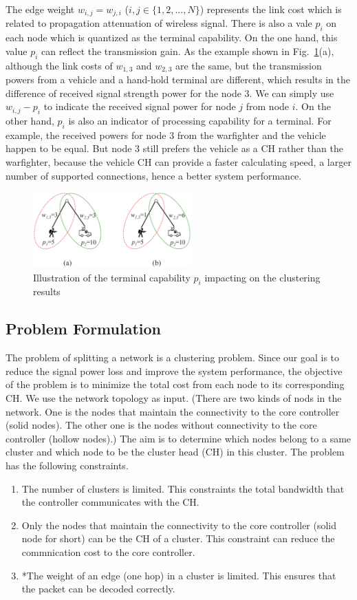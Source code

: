 \documentclass[conference]{IEEEtran}
\begin{document}
The edge weight $w_{i,j}=w_{j,i}$ ($i,j \in \{ 1,2,...,N\}$) represents the link cost which is related to propagation attenuation of wireless signal. There is also a vale $p_i$ on each node which is quantized as the terminal capability. On the one hand, this value $p_i$ can reflect the transmission gain. As the example shown in Fig.~\ref{manvehicle}(a), although the link costs of $w_{1,3}$ and $w_{2,3}$ are the same, but the transmission powers from a vehicle and a hand-hold terminal are different, which results in the difference of received signal strength power for the node 3. We can simply use $w_{i,j}-p_i$ to indicate the received signal power for node $j$ from node $i$. On the other hand, $p_i$ is also an indicator of processing capability for a terminal. For example, the received powers for node 3 from the warfighter and the vehicle happen to be equal. But node 3 still prefers the vehicle as a CH rather than the warfighter, because the vehicle CH can provide a faster calculating speed, a larger number of supported connections, hence a better system performance.
\begin{figure}
\centering
\includegraphics[width=2.4in]{manvehicle}
\caption{Illustration of the terminal capability $p_i$ impacting on the clustering results}
\label{manvehicle}
\end{figure}

\subsection{Problem Formulation}

The problem of splitting a network is a clustering problem. Since our goal is to reduce the signal power loss and improve the system performance, the objective of the problem is to minimize the total cost from each node to its corresponding CH. We use the network topology as input. (There are two kinds of nods in the network. One is the nodes that maintain the connectivity to the core controller (solid nodes). The other one is the nodes without connectivity to the core controller (hollow nodes).) The aim is to determine which nodes belong to a same cluster and which node to be the cluster head (CH) in this cluster. The problem has the following constraints.
\begin{enumerate}
\item The number of clusters is limited. This constraints the total bandwidth that the controller communicates with the CH. 
\item Only the nodes that maintain the connectivity to the core controller (solid node for short) can be the CH of a cluster. This constraint can reduce the commnication cost to the core controller.
\item *The weight of an edge (one hop) in a cluster is limited. This ensures that the packet can be decoded correctly.
\end{enumerate}
\end{document}
